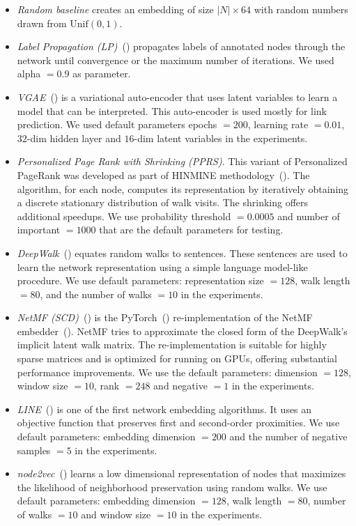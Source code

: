 \documentclass[twoside,11pt]{article}
\begin{document}
\begin{itemize}
\item \emph{Random baseline} creates an embedding of size $|N|\times 64$ with random numbers drawn from $\textrm{Unif}(0,1)$.
\item \emph{Label Propagation (LP)}~(\cite{zhu2002learning}) propagates labels of annotated nodes through the network until convergence or the maximum number of iterations. We used alpha $= 0.9$ as parameter.
\item \emph{VGAE}~(\cite{kipf2016variational}) is a variational auto-encoder that uses latent variables to learn a model that can be interpreted. This auto-encoder is used mostly for link prediction. We used default parameters epochs $=200$, learning rate $=0.01$, $32$-dim hidden layer and $16$-dim latent variables in the experiments.
\item \emph{Personalized Page Rank with Shrinking (PPRS)}. This variant of Personalized PageRank was developed as part of HINMINE methodology~(\cite{kralj2017hinmine}). The algorithm, for each node, computes its representation by iteratively obtaining a discrete stationary distribution of walk visits. The shrinking offers additional speedups. We use probability threshold $= 0.0005$ and number of important $= 1000$ that are the default parameters for testing.
\item \emph{DeepWalk}~(\cite{Perozzi2014deepwalk}) equates random walks to sentences. These sentences are used to learn the network representation using a simple language model-like procedure. We use default parameters: representation size $=128$, walk length $=80$, and the number of walks $= 10$ in the experiments.
\item \emph{NetMF (SCD)}~(\cite{skrlj2019embeddingbased}) is the PyTorch~(\cite{paszke2017automatic}) re-implementation of the NetMF embedder~(\cite{qiu2018network}). NetMF tries to approximate the closed form of the DeepWalk's implicit latent walk matrix. The re-implementation is suitable for highly sparse matrices and is optimized for running on GPUs, offering substantial performance improvements. We use the default parameters: dimension $= 128$, window size $= 10$, rank $= 248$ and negative $= 1$ in the experiments.
\item \emph{LINE}~(\cite{tang2015line}) is one of the first network embedding algorithms. It uses an objective function that preserves first and second-order proximities. We use default parameters: embedding dimension $= 200$ and the number of negative samples $= 5$ in the experiments.
\item \emph{node2vec}~(\cite{grover2016node2vec}) learns a low dimensional representation of nodes that maximizes the likelihood of neighborhood preservation using random walks. We use default parameters: embedding dimension $= 128$, walk length $= 80$, number of walks $= 10$ and window size $= 10$ in the experiments.
\end{itemize}
\end{document}

